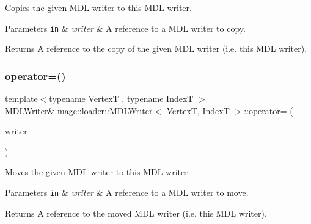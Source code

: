 Copies the given M\+DL writer to this M\+DL writer.


\begin{DoxyParams}[1]{Parameters}
\mbox{\tt in}  & {\em writer} & A reference to a M\+DL writer to copy. \\
\hline
\end{DoxyParams}
\begin{DoxyReturn}{Returns}
A reference to the copy of the given M\+DL writer (i.\+e. this M\+DL writer). 
\end{DoxyReturn}
\hypertarget{classmage_1_1loader_1_1_m_d_l_writer_a4f82a805a9fb84d3cb6a3b63abae1b99}{}\label{classmage_1_1loader_1_1_m_d_l_writer_a4f82a805a9fb84d3cb6a3b63abae1b99} 
\subsubsection{\texorpdfstring{operator=()}{operator=()}\hspace{0.1cm}{\footnotesize\ttfamily [2/2]}}
{\footnotesize\ttfamily template$<$typename VertexT , typename IndexT $>$ \\
\hyperlink{classmage_1_1loader_1_1_m_d_l_writer}{M\+D\+L\+Writer}\& \hyperlink{classmage_1_1loader_1_1_m_d_l_writer}{mage\+::loader\+::\+M\+D\+L\+Writer}$<$ VertexT, IndexT $>$\+::operator= (\begin{DoxyParamCaption}\item[{\hyperlink{classmage_1_1loader_1_1_m_d_l_writer}{M\+D\+L\+Writer}$<$ VertexT, IndexT $>$ \&\&}]{writer }\end{DoxyParamCaption})\hspace{0.3cm}{\ttfamily [delete]}}

Moves the given M\+DL writer to this M\+DL writer.


\begin{DoxyParams}[1]{Parameters}
\mbox{\tt in}  & {\em writer} & A reference to a M\+DL writer to move. \\
\hline
\end{DoxyParams}
\begin{DoxyReturn}{Returns}
A reference to the moved M\+DL writer (i.\+e. this M\+DL writer). 
\end{DoxyReturn}
\hypertarget{classmage_1_1loader_1_1_m_d_l_writer_ac18c8e7d0e770e69a401d07cccd4616a}{}\label{classmage_1_1loader_1_1_m_d_l_writer_ac18c8e7d0e770e69a401d07cccd4616a} 
